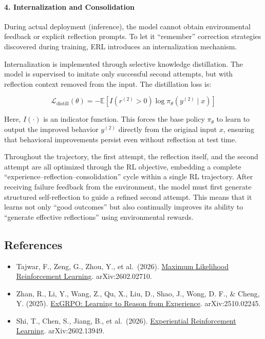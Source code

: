 \hypertarget{internalization-and-consolidation}{%
\paragraph{4. Internalization and Consolidation}\label{internalization-and-consolidation}}

During actual deployment (inference), the model cannot obtain environmental feedback or explicit reflection prompts. To let it ``remember'' correction strategies discovered during training, ERL introduces an internalization mechanism.

Internalization is implemented through selective knowledge distillation. The model is supervised to imitate only successful second attempts, but with reflection context removed from the input. The distillation loss is:

\[
\mathcal{L}_{\mathrm{distill}}(\theta)=-\mathbb{E}\left[I(r^{(2)}\gt 0)\log\pi_\theta(y^{(2)}\mid x)\right]
\]

Here, \(I(\cdot)\) is an indicator function. This forces the base policy \(\pi_\theta\) to learn to output the improved behavior \(y^{(2)}\) directly from the original input \(x\), ensuring that behavioral improvements persist even without reflection at test time.

Throughout the trajectory, the first attempt, the reflection itself, and the second attempt are all optimized through the RL objective, embedding a complete ``experience--reflection--consolidation'' cycle within a single RL trajectory. After receiving failure feedback from the environment, the model must first generate structured self-reflection to guide a refined second attempt. This means that it learns not only ``good outcomes'' but also continually improves its ability to ``generate effective reflections'' using environmental rewards.

\FloatBarrier
{}
\hypertarget{references-113}{%
\subsection{References}\label{references-113}}

\vspace{0.25em}
\begin{itemize}
\tightlist
\item
  Tajwar, F., Zeng, G., Zhou, Y., et al.~(2026). \href{https://arxiv.org/abs/2602.02710}{Maximum Likelihood Reinforcement Learning}. arXiv:2602.02710.
\item
  Zhan, R., Li, Y., Wang, Z., Qu, X., Liu, D., Shao, J., Wong, D. F., \& Cheng, Y. (2025). \href{https://arxiv.org/abs/2510.02245}{ExGRPO: Learning to Reason from Experience}. arXiv:2510.02245.
\item
  Shi, T., Chen, S., Jiang, B., et al.~(2026). \href{https://arxiv.org/abs/2602.13949}{Experiential Reinforcement Learning}. arXiv:2602.13949.
\end{itemize}

\clearpage
